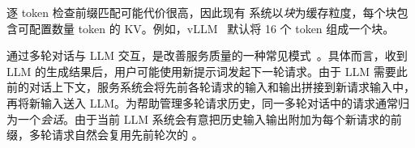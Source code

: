 逐 token 检查前缀匹配可能代价很高，因此现有 {\kvcache} 系统以\emph{块}为缓存粒度，每个块包含可配置数量 token 的 KV。例如，vLLM~\cite{vllm} 默认将 16 个 token 组成一个块。

通过多轮对话与 LLM 交互，是改善服务质量的一种常见模式~\cite{wu2024autogen,wang2023mint}。具体而言，收到 LLM 的生成结果后，用户可能使用新提示词发起下一轮请求。由于 LLM 需要此前的对话上下文，服务系统会将先前各轮请求的输入和输出拼接到新请求输入中，再将新输入送入 LLM。为帮助管理多轮请求历史，同一多轮对话中的请求通常归为一个\emph{会话}。由于当前 LLM 系统会有意把历史输入输出附加为每个新请求的前缀，多轮请求自然会复用先前轮次的 {\kvcache}。

